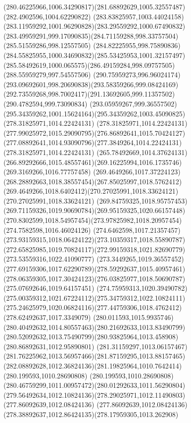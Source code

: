 {{\curveto(280.46225966,1006.34290817)(281.68892629,1005.32557487)(282.4902596,1004.62290822)
\curveto(283.83825957,1003.44024158)(283.11959292,1001.96290828)(283.29559292,1000.67490832)
\curveto(283.49959291,999.17090835)(284.71159288,998.33757504)(285.51559286,998.12557505)
\curveto(284.82225955,998.75890836)(284.55825955,1000.34690832)(285.53425953,1001.32157497)
\curveto(285.58492619,1000.065575)(286.49159284,998.09757505)(288.55959279,997.54557506)
\curveto(290.75959273,996.96024174)(293.09692601,998.20690838)(293.58359266,999.08424169)
\curveto(292.73559268,998.7002417)(291.13692605,999.11357502)(290.4782594,999.73090834)
\curveto(293.05959267,999.36557502)(295.34359262,1001.15624164)(295.34359262,1003.45090825)
\moveto(278.31825971,1014.22424131)
\curveto(278.31825971,1014.22424131)(277.99025972,1015.29090795)(276.86892641,1015.70424127)
\curveto(277.08892641,1014.93090796)(277.3849264,1014.22424131)(278.31825971,1014.22424131)
\moveto(265.78492669,1014.37624131)
\curveto(266.89292666,1015.48557461)(269.16225994,1016.1735746)(269.3169266,1016.77757458)
\curveto(269.4649266,1017.37224123)(268.28892663,1018.38557454)(267.85025997,1018.5762412)
\curveto(269.4649266,1018.6402412)(270.27025991,1018.33624121)(270.27025991,1018.33624121)
\curveto(269.84759325,1018.95757453)(269.71159326,1019.90690784)(269.95159325,1020.66157448)
\curveto(270.8302599,1018.54957454)(273.97825982,1018.20957454)(274.7582598,1016.46024126)
\curveto(274.6462598,1017.21357457)(273.93159315,1018.06424122)(273.10359317,1018.55890787)
\curveto(272.65825985,1019.70824117)(272.99159318,1021.82690779)(273.53559316,1022.41090777)
\curveto(273.3449265,1019.36557452)(277.69159306,1017.62290789)(278.59292637,1015.40957461)
\curveto(278.06359305,1017.30424123)(276.03825977,1018.50690787)(275.07692646,1019.64157451)
\curveto(274.75959313,1020.39490782)(275.00359312,1021.67224112)(275.34759312,1022.10824111)
\curveto(275.24625979,1020.06824116)(277.44759306,1018.4762412)(278.62492637,1017.3349079)
\curveto(280.011593,1015.9935746)(280.40492632,1014.80557463)(280.21692633,1013.83490799)
\curveto(280.52092632,1013.75490799)(280.93825964,1013.458908)(280.86892631,1012.95890801)
\curveto(281.31159297,1013.06157467)(281.76225962,1013.56957466)(281.87159295,1013.88157465)
\curveto(282.08892628,1012.36824136)(281.19825964,1010.7642414)(280.199593,1010.28690808)
\curveto(280.199593,1010.28690808)(280.46759299,1011.00957472)(280.01292633,1011.56290804)
\curveto(279.56492634,1012.10824136)(278.29025971,1012.11490803)(277.86092639,1012.08424136)
\curveto(277.86092639,1012.08424136)(278.38892637,1012.86424135)(278.17959305,1013.262908)
}}
